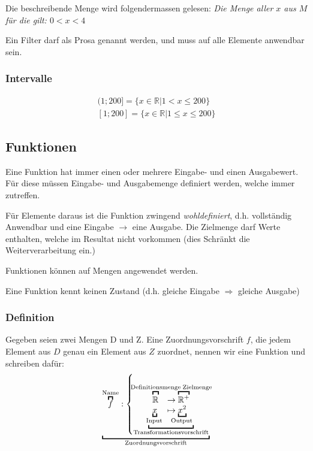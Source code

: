 \begin{multicols}{2}
Die beschreibende Menge wird folgendermassen gelesen:
\emph{Die Menge aller $x$ aus $M$ für die gilt: $0<x<4$} 

Ein Filter darf als Prosa genannt werden, und muss auf alle Elemente anwendbar sein.

\subsubsection{Intervalle}
\begin{align*}
	(1;200] = \{x \in\mathbb{R}|1<x \leq 200\} \\
	[1;200] = \{x\in\mathbb{R}|1\leq x \leq 200\}
\end{align*}

\subsection{Funktionen}
Eine Funktion hat immer einen oder mehrere Eingabe- und einen Ausgabewert. Für diese müssen Eingabe- und Ausgabemenge definiert werden, welche immer zutreffen.

Für Elemente daraus ist die Funktion zwingend \emph{wohldefiniert}, d.h. vollständig Anwendbar und eine Eingabe $\to$ eine Ausgabe. Die Zielmenge darf Werte enthalten, welche im Resultat nicht vorkommen (dies Schränkt die Weiterverarbeitung ein.)

Funktionen können auf Mengen angewendet werden.

Eine Funktion kennt keinen Zustand (d.h. gleiche Eingabe $\Rightarrow$ gleiche Ausgabe)



\subsubsection{Definition}
	Gegeben seien zwei Mengen D und Z. Eine Zuordnungsvorschrift $f$, die jedem Element aus $D$ genau ein Element aus $Z$ zuordnet, nennen wir eine Funktion und schreiben dafür:
	\[
		\underbracket{
			\overbracket{f}^\text{Name} : \left\{
			\underbracket{
				\begin{array}{ll}
					\overbracket{
						\mathbb{R}^{\vphantom{+}} %
					}^{
						\mathclap{
							\text{Definitionsmenge}
						}
					}
					& \to \overbracket{
						\mathbb{R}^+
					}^{
						\mathrlap{\!\text{Zielmenge}}
					} \\
					\underbracket{x}_{
						\mathclap{\!\text{Input}}
					}
					& \mapsto \underbracket{x^2}_{
						\mathclap{\!\text{Output}}
					}
				\end{array}
			}_\text{Transformationsvorschrift}
			\right.
		}_\text{Zuordnungsvorschrift}
	\]


\end{multicols}
